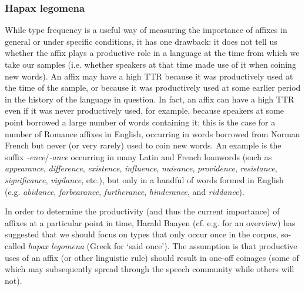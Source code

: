 \subsubsection{Hapax legomena}
While type frequency  is a useful way of measuring  the importance of affixes  in general or under specific conditions, it has one drawback: it does not tell us whether the affix  plays a productive  role in a language at the time from which we take our samples (i.e. whether speakers at that time made use of it when coining new words). An affix  may have a high TTR  because it was productively used at the time of the sample, or because it was productively used at some earlier period in the history of the language in question. In fact, an affix  can have a high TTR even if it was never productively  used, for example, because speakers at some point borrowed a large number of words containing it; this is the case for a number of Romance affixes  in English, occurring in words borrowed from Norman French but never (or very rarely) used to coin new words. An example is the  suffix \textit{-ence}\slash \textit{-ance} occurring in many Latin and French loanwords (such as \textit{appearance}, \textit{difference}, \textit{existence}, \textit{influence}, \textit{nuisance}, \textit{providence}, \textit{resistance}, \textit{significance}, \textit{vigilance}, etc.), but only in a handful of words formed in English (e.g. \textit{abidance}, \textit{forbearance}, \textit{furtherance}, \textit{hinderance}, and \textit{riddance}).

In order to determine the productivity  (and thus the current importance) of affixes  at a particular point in time, Harald Baayen (cf. e.g. \citealt{baayen_41._2009} for an overview) has suggested that we should focus on types  that only occur once in the corpus, so\hyp{}called \textit{hapax legomena}  (Greek for `said once'). The assumption is that productive  uses of an affix  (or other linguistic rule) should result in one\hyp{}off coinages (some of which may subsequently spread through the speech community while others will not).

